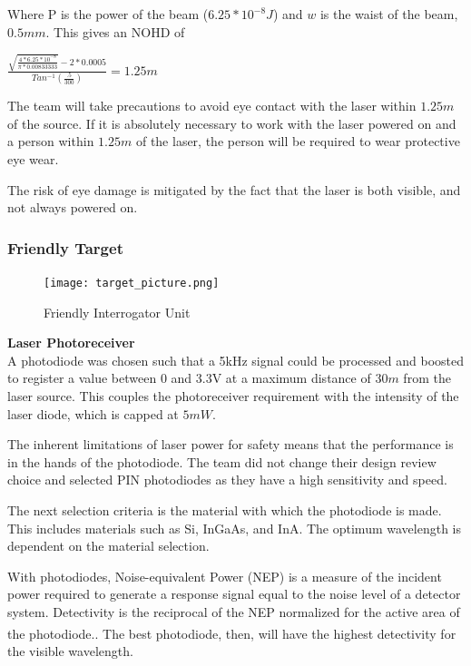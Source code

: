 \documentclass[letterpaper,10pt]{article}
\begin{document}
\begin{spacing}{1.15}
 Where P is the power of the beam ($6.25*10^{-8} J$) and $w$ is the waist of the beam, $0.5mm$. This gives an NOHD of 
 \begin{center}
 	\large
 	$ \frac{\sqrt{\frac{4 * 6.25*10^{-8} }{\pi * 0.00833333}} - 2*0.0005}{Tan^{-1}(\frac{.5}{300})} = 1.25 m$
 \end{center}
 
 The team will take precautions to avoid eye contact with the laser within $1.25m$ of the source. If it is absolutely necessary to work with the laser powered on and a person within $1.25m$ of the laser, the person will be required to wear protective eye wear. 
 
 The risk of eye damage is mitigated by the fact that the laser is both visible, and not always powered on. 

\subsubsection{Friendly Target}


\begin{figure} [H]
	\centering
	\texttt{[image: target\_picture.png]}
	\caption{Friendly Interrogator Unit\label{fig:threshold}}
\end{figure}


\hspace{5mm}\textbf{Laser Photoreceiver} \label{section:laser-photoreceiver-design-procedure}\\
A photodiode was chosen such that a 5kHz signal could be processed and boosted to register a value between 0 and 3.3V at a maximum distance of $30m$ from the laser source. This couples the photoreceiver requirement with the intensity of the laser diode, which is capped at $5 mW$. 

The inherent limitations of laser power for safety means that the performance is in the hands of the photodiode. The team did not change their design review choice and selected PIN photodiodes as they have a high sensitivity and speed.

The next selection criteria is the material with which the photodiode is made. This includes materials such as Si, InGaAs, and InA. The optimum wavelength is dependent on the material selection.

With photodiodes, Noise-equivalent Power (NEP) is a measure of the incident power required to generate a response signal equal to the noise level of a detector system. Detectivity is the reciprocal of the NEP normalized for the active area of the photodiode.\textsuperscript{\cite{Microphotonics}}. The best photodiode, then, will have the highest detectivity for the visible wavelength.  


\end{spacing}
\end{document}
